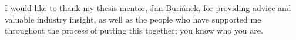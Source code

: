 \documentclass[english,bachelor,unicode]{ctufit-thesis}
\theoremstyle{plain}
\theoremstyle{definition}
\theoremstyle{remark}
\numberwithin{theorem}{chapter}
\begin{document}
 


\frontmatter\frontmatterinit %


\thispagestyle{empty}\cleardoublepage\maketitle %

\imprintpage %

\tableofcontents %
\listoffigures %
\begingroup
\let\clearpage\relax
\listoftables %
\listoflistings %
\endgroup

\begin{acknowledgmentpage}
	I would like to thank my thesis mentor, Jan Buriánek, for providing advice and valuable industry insight,
    as well as the people who have supported me throughout the process of putting this together; you know who you are.
\end{acknowledgmentpage} 
\end{document}
